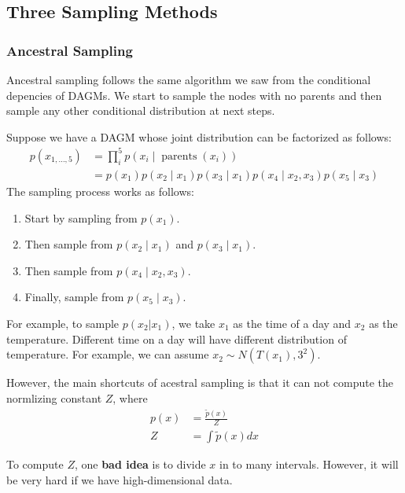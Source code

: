 \subsection{Three Sampling Methods}
\subsubsection*{Ancestral Sampling}
Ancestral sampling follows the same algorithm we saw from the conditional depencies of DAGMs. We start to sample the nodes with no parents and then sample any other conditional distribution at next steps.
\begin{example}
    Suppose we have a DAGM whose joint distribution can be factorized as follows:
    $$
    \begin{aligned}
    p\left(x_{1, \ldots, 5}\right) & =\prod_i^5 p\left(x_i \mid \operatorname{parents}\left(x_i\right)\right) \\
    & =p\left(x_1\right) p\left(x_2 \mid x_1\right) p\left(x_3 \mid x_1\right) p\left(x_4 \mid x_2, x_3\right) p\left(x_5 \mid x_3\right)
    \end{aligned}
    $$
    The sampling process works as follows:
    \begin{enumerate}
        \item Start by sampling from $p\left(x_1\right)$.
        \item Then sample from $p\left(x_2 \mid x_1\right)$ and $p\left(x_3 \mid x_1\right)$.
        \item Then sample from $p\left(x_4 \mid x_2, x_3\right)$.
        \item Finally, sample from $p\left(x_5 \mid x_3\right)$.
    \end{enumerate}
    For example, to sample $p(x_2|x_1)$, we take $x_1$ as the time of a day and $x_2$ as the temperature. Different time on a day will have different distribution of temperature. For example, we can assume $x_2\sim N(T(x_1),3^2)$.
\end{example}

However, the main shortcuts of acestral sampling is that it can not compute the normlizing constant $Z$, where 
\begin{align*}
    p(x) &=\frac{\tilde{p}(x)}{Z}\\
    Z &=\int \tilde{p}(x) d x
\end{align*}

To compute $Z$, one \textbf{bad idea} is to divide $x$ in to many intervals. However, it will be very hard if we have high-dimensional data.\\

